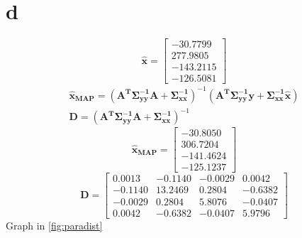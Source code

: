 \section{d}
\begin{equation*}
	\bm{\hat{x}} = \begin{bmatrix}
		-30.7799 \\
		277.9805 \\
		-143.2115 \\
		-126.5081
	\end{bmatrix}
\end{equation*}
\begin{gather*}
	\bm{\hat{x}_{MAP}} = (\bm{A^{T}} \bm{\Sigma_{yy}^{-1}} \bm{A} + \bm{\Sigma_{xx}^{-1}})^{-1}(\bm{A^{T}}\bm{\Sigma_{yy}^{-1}}\bm{y} + \bm{\Sigma_{xx}^{-1}}\bm{\hat{x}}) \\
	\bm{D} = (\bm{A^{T}} \bm{\Sigma_{yy}^{-1}} \bm{A} + \bm{\Sigma_{xx}^{-1}})^{-1}
\end{gather*}
\begin{equation*}
	\bm{\hat{x}_{MAP}} = \begin{bmatrix}
		-30.8050 \\
		306.7204 \\
		-141.4624 \\
		-125.1237
	\end{bmatrix}
\end{equation*}
\begin{equation*}
	\bm{D} = \begin{bmatrix}
		0.0013 & -0.1140 & -0.0029 & 0.0042 \\
		-0.1140 & 13.2469 & 0.2804 & -0.6382 \\
		-0.0029 & 0.2804 & 5.8076 & -0.0407 \\
		0.0042 & -0.6382 & -0.0407 & 5.9796
	\end{bmatrix}
\end{equation*}
Graph in \autoref{fig:paradist}
\begin{figure}[htpb]\centering
	\caption{}
	\label{fig:paradist}
\end{figure}\\
